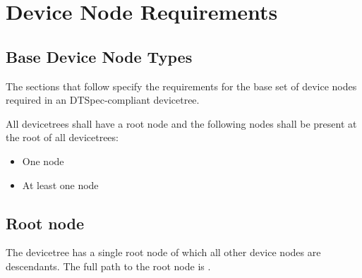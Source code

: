 \documentclass[a4paper,10pt,oneside]{sphinxmanual}
\begin{document}
\chapter{Device Node Requirements}
\label{devicenodes:chapter-device-node-requirements}\label{devicenodes:device-node-requirements}\label{devicenodes::doc}

\section{Base Device Node Types}
\label{devicenodes:base-device-node-types}
The sections that follow specify the requirements for the base set of
device nodes required in an DTSpec-compliant devicetree.

All devicetrees shall have a root node and the following nodes shall be
present at the root of all devicetrees:
\begin{itemize}
\item {} 
One  node

\item {} 
At least one  node

\end{itemize}


\section{Root node}
\label{devicenodes:root-node}
The devicetree has a single root node of which all other device nodes
are descendants. The full path to the root node is \code{/}.
\end{document}
